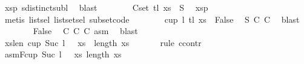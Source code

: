 \begin{isabellebody}
\ xs{}p{}\ sdistinct{\isacharunderscore}{\kern0pt}subl\ \isamarkupfalse%
\ blast\isanewline
\ \ \ \ \ \ \isamarkupfalse%
\ C{}{\isacharcolon}{\kern0pt}{\isachardoublequoteopen}set\ {\isacharparenleft}{\kern0pt}tl\ xs{}{\isacharparenright}{\kern0pt}\ {\isasymsubseteq}\ S{}{\isachardoublequoteclose}\ \isamarkupfalse%
\ xs{}p{}\isanewline
\ \ \ \ \ \ \ \ \isamarkupfalse%
\ {\isacharparenleft}{\kern0pt}metis\ list{\isachardot}{\kern0pt}sel{\isacharparenleft}{\kern0pt}{}{\isacharparenright}{\kern0pt}\ list{\isachardot}{\kern0pt}set{\isacharunderscore}{\kern0pt}sel{\isacharparenleft}{\kern0pt}{}{\isacharparenright}{\kern0pt}\ subset{\isacharunderscore}{\kern0pt}code{\isacharparenleft}{\kern0pt}{}{\isacharparenright}{\kern0pt}{\isacharparenright}{\kern0pt}\isanewline
\isanewline
\ \ \ \ \ \ \isamarkupfalse%
\ {\isachardoublequoteopen}cup\ {\isacharparenleft}{\kern0pt}l{\isacharplus}{\kern0pt}{}{\isacharparenright}{\kern0pt}\ {\isacharparenleft}{\kern0pt}tl\ xs{}{\isacharparenright}{\kern0pt}\ {\isasymLongrightarrow}\ False{\isachardoublequoteclose}\ \isamarkupfalse%
\ S{}{\isacharparenleft}{\kern0pt}{}{\isacharparenright}{\kern0pt}\ C{}\ C{}\ \isamarkupfalse%
\ blast\isanewline
\ \ \ \ \ \ \isamarkupfalse%
\ False\ \isamarkupfalse%
\ C{}\ C{}\ C{}\ asm{\isacharparenleft}{\kern0pt}{}{\isacharparenright}{\kern0pt}\ \isamarkupfalse%
\ blast\isanewline
\ \ \ \ \isamarkupfalse%
\isanewline
\isanewline
\ \ \ \ \isamarkupfalse%
\ xs{}{\isacharunderscore}{\kern0pt}len{}{\isacharcolon}{\kern0pt}\ {\isachardoublequoteopen}cup\ {\isacharparenleft}{\kern0pt}Suc\ {\isacharparenleft}{\kern0pt}l\ {\isacharplus}{\kern0pt}\ {}{\isacharparenright}{\kern0pt}{\isacharparenright}{\kern0pt}\ xs\ {\isasymLongrightarrow}\ length\ xs{}\ {\isacharequal}{\kern0pt}\ {}{\isachardoublequoteclose}\isanewline
\ \ \ \ \isamarkupfalse%
{\isacharparenleft}{\kern0pt}rule\ ccontr{\isacharparenright}{\kern0pt}\isanewline
\ \ \ \ \ \ \isamarkupfalse%
\ asmF{\isacharcolon}{\kern0pt}{\isachardoublequoteopen}cup\ {\isacharparenleft}{\kern0pt}Suc\ {\isacharparenleft}{\kern0pt}l\ {\isacharplus}{\kern0pt}\ {}{\isacharparenright}{\kern0pt}{\isacharparenright}{\kern0pt}\ xs{\isachardoublequoteclose}\ {\isachardoublequoteopen}length\ xs{}\ {\isasymnoteq}\ {}{\isachardoublequoteclose}\isanewline

\end{isabellebody}
